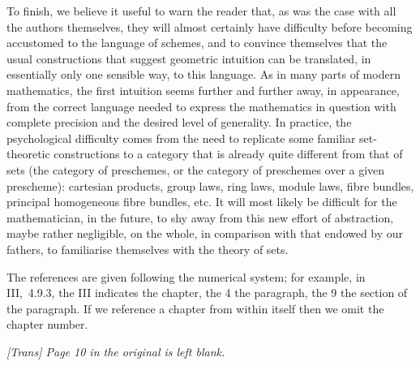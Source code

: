 \sectionbreak

To finish, we believe it useful to warn the reader that, as was the case with
all the authors themselves, they will almost certainly have difficulty before
becoming accustomed to the language of schemes, and to convince themselves that
the usual constructions that suggest geometric intuition can be translated, in
essentially only one sensible way, to this language. As in many parts of modern
mathematics, the first intuition seems further and further away, in appearance,
from the correct language needed to express the mathematics in question with
complete precision and the desired level of generality. In practice, the
psychological difficulty comes from the need to replicate some familiar
set-theoretic constructions to a category that is already quite different from
that of sets (the category of preschemes, or the category of preschemes over a
given prescheme): cartesian products, group laws, ring laws, module laws, fibre
bundles, principal homogeneous fibre bundles, etc. It will most likely
be difficult for the mathematician, in the future, to shy away from this new
effort of abstraction, maybe rather negligible, on the whole, in comparison with
that endowed by our fathers, to familiarise themselves with the theory of sets.

\sectionbreak

The references are given following the numerical system; for example, in
III,~4.9.3, the III indicates the chapter, the 4 the paragraph, the 9 the
section of the paragraph. If we reference a chapter from within itself then we
omit the chapter number.

\bigskip

\emph{[Trans] Page 10 in the original is left blank.}






